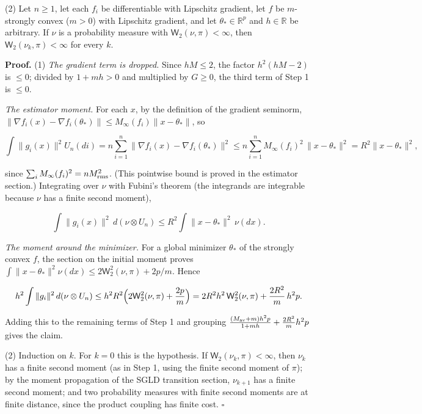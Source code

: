 \documentclass[11pt,a4paper]{article}
\begin{document}
(2) Let \(n\ge1\), let each \(f_i\) be differentiable with Lipschitz gradient, let \(f\) be \(m\)-strongly convex (\(m>0\)) with Lipschitz gradient, and let \(\theta_*\in\mathbb R^p\) and \(h\in\mathbb R\) be arbitrary. If \(\nu\) is a probability measure with \(\mathsf W_2(\nu,\pi)<\infty\), then \(\mathsf W_2(\nu_k,\pi)<\infty\) for every \(k\).




\textbf{Proof.} (1) \emph{The gradient term is dropped.} Since \(hM\le2\), the factor \(h^2(hM-2)\) is \(\le0\); divided by \(1+mh>0\) and multiplied by \(G\ge0\), the third term of Step 1 is \(\le0\).




\emph{The estimator moment.} For each \(x\), by the definition of the gradient seminorm, \(\|\nabla f_i(x)-\nabla f_i(\theta_*)\|\le M_\infty(f_i)\|x-\theta_*\|\), so


\[\int\|g_i(x)\|^2U_n(di)=n\sum_{i=1}^n\|\nabla f_i(x)-\nabla f_i(\theta_*)\|^2\le n\sum_{i=1}^nM_\infty(f_i)^2\,\|x-\theta_*\|^2=R^2\|x-\theta_*\|^2,\]


since \(\sum_iM_\infty(f_i)^2=nM_{\rm rms}^2\). (This pointwise bound is proved in the estimator section.) Integrating over \(\nu\) with Fubini's theorem (the integrands are integrable because \(\nu\) has a finite second moment),


\[\int\|g_i(x)\|^2\,d(\nu\otimes U_n)\le R^2\int\|x-\theta_*\|^2\,\nu(dx).\]


\emph{The moment around the minimizer.} For a global minimizer \(\theta_*\) of the strongly convex \(f\), the section on the initial moment proves \(\int\|x-\theta_*\|^2\nu(dx)\le2\mathsf W_2^2(\nu,\pi)+2p/m\). Hence


\[h^2\int\|g_i\|^2\,d(\nu\otimes U_n)\le h^2R^2\Bigl(2\mathsf W_2^2(\nu,\pi)+\frac{2p}m\Bigr)=2R^2h^2\,\mathsf W_2^2(\nu,\pi)+\frac{2R^2}m\,h^2p.\]


Adding this to the remaining terms of Step 1 and grouping \(\frac{(M_{\rm av}+m)h^2p}{1+mh}+\frac{2R^2}mh^2p\) gives the claim.




(2) Induction on \(k\). For \(k=0\) this is the hypothesis. If \(\mathsf W_2(\nu_k,\pi)<\infty\), then \(\nu_k\) has a finite second moment (as in Step 1, using the finite second moment of \(\pi\)); by the moment propagation of the SGLD transition section, \(\nu_{k+1}\) has a finite second moment; and two probability measures with finite second moments are at finite distance, since the product coupling has finite cost. \(\square\)
\end{document}
